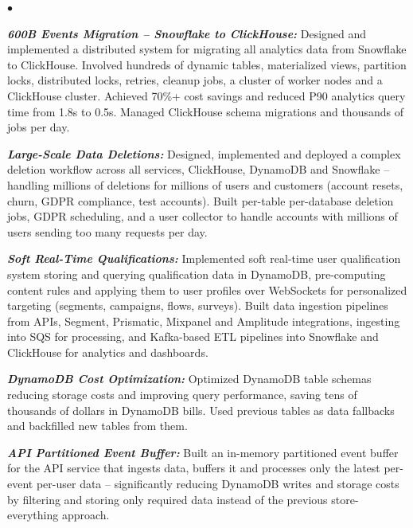 \documentclass[a4paper]{article}
\newenvironment{achievements}{\begin{list}{$\bullet$}{\topsep 0pt \itemsep
  -2pt}}{\vspace*{4pt}\end{list}}
\newcommand{\emphasys}[1]{\textbf{\emph{#1}}}
\begin{document}
\begin{achievements}
  \item \emphasys{600B Events Migration -- Snowflake to ClickHouse:} Designed and implemented a distributed system for migrating all analytics data from Snowflake to ClickHouse. Involved hundreds of dynamic tables, materialized views, partition locks, distributed locks, retries, cleanup jobs, a cluster of worker nodes and a ClickHouse cluster. Achieved 70\%+ cost savings and reduced P90 analytics query time from 1.8s to 0.5s. Managed ClickHouse schema migrations and thousands of jobs per day.
  \item \emphasys{Large-Scale Data Deletions:} Designed, implemented and deployed a complex deletion workflow across all services, ClickHouse, DynamoDB and Snowflake -- handling millions of deletions for millions of users and customers (account resets, churn, GDPR compliance, test accounts). Built per-table per-database deletion jobs, GDPR scheduling, and a user collector to handle accounts with millions of users sending too many requests per day.
  \item \emphasys{Soft Real-Time Qualifications:} Implemented soft real-time user qualification system storing and querying qualification data in DynamoDB, pre-computing content rules and applying them to user profiles over WebSockets for personalized targeting (segments, campaigns, flows, surveys). Built data ingestion pipelines from APIs, Segment, Prismatic, Mixpanel and Amplitude integrations, ingesting into SQS for processing, and Kafka-based ETL pipelines into Snowflake and ClickHouse for analytics and dashboards.
  \item \emphasys{DynamoDB Cost Optimization:} Optimized DynamoDB table schemas reducing storage costs and improving query performance, saving tens of thousands of dollars in DynamoDB bills. Used previous tables as data fallbacks and backfilled new tables from them.
  \item \emphasys{API Partitioned Event Buffer:} Built an in-memory partitioned event buffer for the API service that ingests data, buffers it and processes only the latest per-event per-user data -- significantly reducing DynamoDB writes and storage costs by filtering and storing only required data instead of the previous store-everything approach.


\end{achievements}
\end{document}
